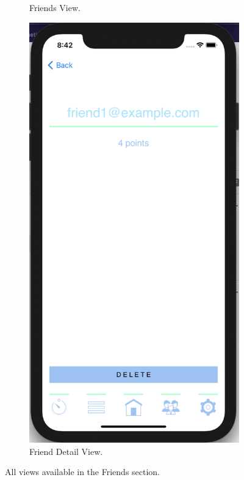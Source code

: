 \begin{figure}[H]
\begin{subfigure}[b]{0.3\textwidth}
        \caption{Friends View.}
        \label{fig:friends_app}
    \end{subfigure}
    \hfill
    \begin{subfigure}[b]{0.3\textwidth}
        \centering
        \includegraphics[width=\textwidth]{./graphics/Implementation/Friends/friend detail.png}
        \caption{Friend Detail View.}
        \label{fig:friend_detail_app}
    \end{subfigure}
    
    \caption{All views available in the Friends section.}
    \label{fig:friends_views_app}
\end{figure}